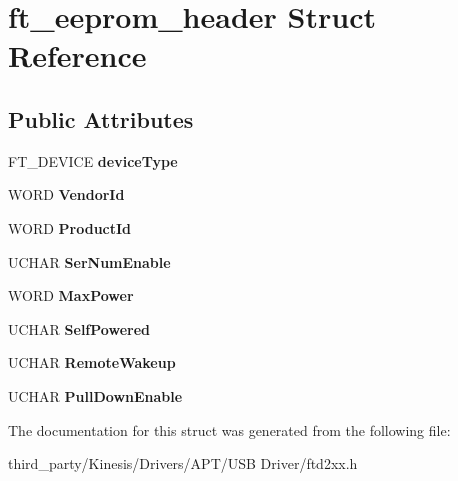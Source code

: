 \hypertarget{structft__eeprom__header}{}\section{ft\+\_\+eeprom\+\_\+header Struct Reference}
\label{structft__eeprom__header}
\subsection*{Public Attributes}
\begin{DoxyCompactItemize}
\item 
F\+T\+\_\+\+D\+E\+V\+I\+CE {\bfseries device\+Type}\hypertarget{structft__eeprom__header_a3b27d86c243b51e47e6c279f0ef56251}{}\label{structft__eeprom__header_a3b27d86c243b51e47e6c279f0ef56251}

\item 
W\+O\+RD {\bfseries Vendor\+Id}\hypertarget{structft__eeprom__header_a63538171dfe221e65f0bd27938239c30}{}\label{structft__eeprom__header_a63538171dfe221e65f0bd27938239c30}

\item 
W\+O\+RD {\bfseries Product\+Id}\hypertarget{structft__eeprom__header_a342079ae92d0b71e0e71bde526ded445}{}\label{structft__eeprom__header_a342079ae92d0b71e0e71bde526ded445}

\item 
U\+C\+H\+AR {\bfseries Ser\+Num\+Enable}\hypertarget{structft__eeprom__header_a04737398a9c4f758975303df5f0430e6}{}\label{structft__eeprom__header_a04737398a9c4f758975303df5f0430e6}

\item 
W\+O\+RD {\bfseries Max\+Power}\hypertarget{structft__eeprom__header_a28ce835ee57a5f21794798f64022d89b}{}\label{structft__eeprom__header_a28ce835ee57a5f21794798f64022d89b}

\item 
U\+C\+H\+AR {\bfseries Self\+Powered}\hypertarget{structft__eeprom__header_a98fe9504d952d4d579dd8d047a70d175}{}\label{structft__eeprom__header_a98fe9504d952d4d579dd8d047a70d175}

\item 
U\+C\+H\+AR {\bfseries Remote\+Wakeup}\hypertarget{structft__eeprom__header_a923b8578325e21645cc18b54784966f4}{}\label{structft__eeprom__header_a923b8578325e21645cc18b54784966f4}

\item 
U\+C\+H\+AR {\bfseries Pull\+Down\+Enable}\hypertarget{structft__eeprom__header_a3a9b620423c2d0d1f452269c255f4209}{}\label{structft__eeprom__header_a3a9b620423c2d0d1f452269c255f4209}

\end{DoxyCompactItemize}


The documentation for this struct was generated from the following file\+:\begin{DoxyCompactItemize}
\item 
third\+\_\+party/\+Kinesis/\+Drivers/\+A\+P\+T/\+U\+S\+B Driver/ftd2xx.\+h\end{DoxyCompactItemize}
